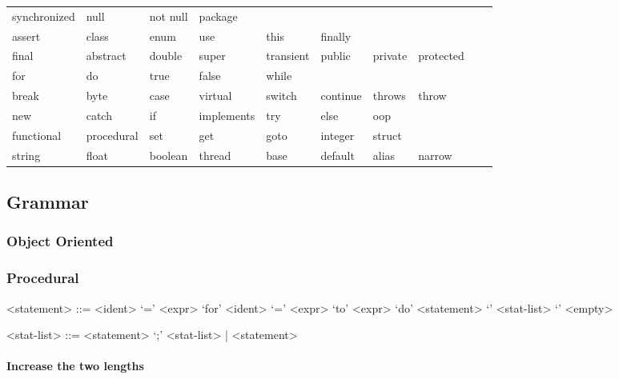 \documentclass[hidelinks]{article}
\begin{document}
\begin{tabular}{llllllllll}
synchronized & null & not null & package & \\
assert & class & enum & use & this & finally & \\
final & abstract & double & super & transient & public & private & protected & \\
for & do & true & false & while & \\
break & byte & case & virtual & switch & continue & throws & throw & \\
new & catch & if & implements & try & else & oop & \\
functional & procedural & set & get & goto & integer & struct & \\
string & float & boolean & thread & base & default & alias & narrow \\
\end{tabular}
\subsection{Grammar}
\subsubsection{Object Oriented}
\subsubsection{Procedural}
\begin{grammar}

<statement> ::= <ident> `=' <expr> 
\alt `for' <ident> `=' <expr> `to' <expr> `do' <statement> 
\alt `{' <stat-list> `}' 
\alt <empty> 

<stat-list> ::= <statement> `;' <stat-list> | <statement> 

\end{grammar}
\paragraph{Increase the two lengths}
\setlength{\grammarparsep}{20pt plus 1pt minus 1pt} %
\setlength{\grammarindent}{12em} %
\end{document}
